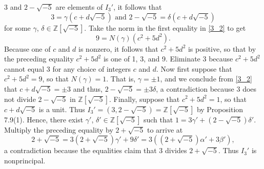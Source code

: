 \documentclass[9pt]{article}
\newcommand{\Z}{\mathbb{Z}}
\begin{document}
\begin{enumerate}
\begin{enumerate}
               3 and $2 - \sqrt{-5}$ are elements of $I_3'$, it follows that
               \begin{equation} \label{3_2}
                  3 = \gamma(c + d\sqrt{-5}) \text{ and }
                  2 - \sqrt{-5} = \delta(c + d\sqrt{-5})
               \end{equation}
               for some $\gamma$, $\delta \in \Z[\sqrt{-5}]$. Take the norm in
               the first equality in \eqref{3_2} to get
               $$9 = N(\gamma)(c^2 + 5d^2).$$
               Because one of $c$ and $d$ is nonzero, it follows that
               $c^2 + 5d^2$ is positive, so that by the preceding equality
               $c^2 + 5d^2$ is one of 1, 3, and 9. Eliminate 3 because
               $c^2 + 5d^2$ cannot equal 3 for any choice of integers $c$ and
               $d$. Now first suppose that $c^2 + 5d^2 = 9$, so that
               $N(\gamma) = 1$. That is, $\gamma = \pm1$, and we conclude from
               \eqref{3_2} that $c + d\sqrt{-5} = \pm3$ and thus,
               $2 - \sqrt{-5} = \pm3\delta$, a contradiction because 3 does not
               divide $2 - \sqrt{-5}$ in $\Z[\sqrt{-5}]$. Finally, suppose that
               $c^2 + 5d^2 = 1$, so that $c + d\sqrt{-5}$ is a unit. Thus
               $I_3' = (3, 2 - \sqrt{-5}) = \Z[\sqrt{-5}]$ by Proposition
               7.9(1). Hence, there exist $\gamma'$,
               $\delta' \in \Z[\sqrt{-5}]$ such that
               $1 = 3\gamma' + (2 - \sqrt{-5})\delta'$. Multiply the
               preceding equality by $2 + \sqrt{-5}$ to arrive at
               $$2 + \sqrt{-5} = 3(2 + \sqrt{-5})\gamma' + 9\delta' =
                 3((2 + \sqrt{-5})\alpha' + 3\beta'),$$
               a contradiction because the equalities claim that 3 divides
               $2 + \sqrt{-5}$. Thus $I_3'$ is nonprincipal.
      \end{enumerate}
\end{enumerate}
\end{document}
